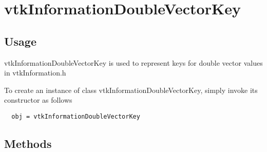 \section{vtkInformationDoubleVectorKey}

\subsection{Usage}

 vtkInformationDoubleVectorKey is used to represent keys for double
 vector values in vtkInformation.h

To create an instance of class vtkInformationDoubleVectorKey, simply
invoke its constructor as follows
\begin{verbatim}
  obj = vtkInformationDoubleVectorKey
\end{verbatim}
\subsection{Methods}

